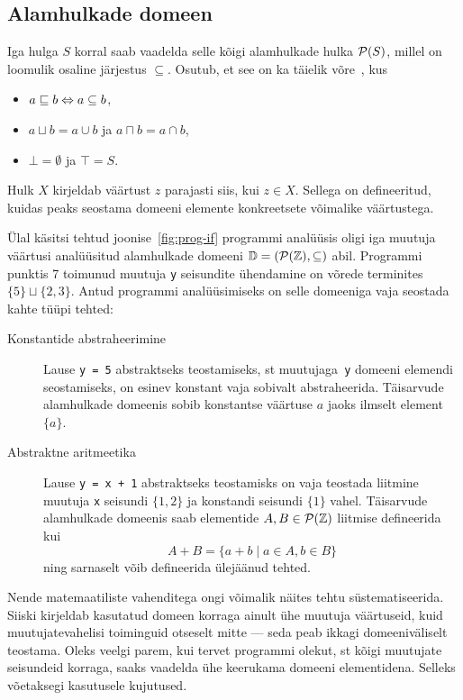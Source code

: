 \documentclass[../thesis.tex]{subfiles}
\begin{document}
\subsection{Alamhulkade domeen}
Iga hulga $S$ korral saab vaadelda selle kõigi alamhulkade hulka $\mathcal{P}(S)$, millel on loomulik osaline järjestus $\subseteq$.
Osutub, et see on ka täielik võre~\cite[6]{laan_voreteooria}, kus
\begin{itemize}[nosep]
	\item $a \sqsubseteq b \Leftrightarrow a \subseteq b$,
	\item $a \sqcup b = a \cup b$ ja $a \sqcap b = a \cap b$,
	\item $\bot = \emptyset$ ja $\top = S$.
\end{itemize}

Hulk $X$ kirjeldab väärtust $z$ parajasti siis, kui $z \in X$. Sellega on defineeritud, kuidas peaks seostama domeeni elemente konkreetsete võimalike väärtustega.

Ülal käsitsi tehtud joonise~\ref{fig:prog-if} programmi analüüsis oligi iga muutuja väärtusi analüüsitud alamhulkade domeeni $\mathbb{D} = (\mathcal{P}(\mathbb{Z}), \subseteq)$ abil. Programmi punktis 7 toimunud muutuja \texttt{y} seisundite ühendamine on võrede terminites $\{5\} \sqcup \{2, 3\}$. Antud programmi analüüsimiseks on selle domeeniga vaja seostada kahte tüüpi tehted:
\begin{description}
	\item[Konstantide abstraheerimine] Lause \texttt{y = 5} abstraktseks teostamiseks, st muutujaga~\texttt{y} domeeni elemendi seostamiseks, on esinev konstant vaja sobivalt abstraheerida. Täisarvude alamhulkade domeenis sobib konstantse väärtuse $a$ jaoks ilmselt element $\{a\}$.

	\item[Abstraktne aritmeetika] Lause \texttt{y = x + 1} abstraktseks teostamisks on vaja teostada liitmine muutuja \texttt{x} seisundi $\{1, 2\}$ ja konstandi seisundi $\{1\}$ vahel. Täisarvude alamhulkade domeenis saab elementide $A, B \in \mathcal{P}(\mathbb{Z})$ liitmise defineerida kui
	\[
		A + B = \{a + b \mid a \in A, b \in B\}
	\]
	ning sarnaselt võib defineerida ülejäänud tehted.
\end{description}

Nende matemaatiliste vahenditega ongi võimalik näites tehtu süstematiseerida. Siiski kirjeldab kasutatud domeen korraga ainult ühe muutuja väärtuseid, kuid muutujatevahelisi toiminguid otseselt mitte --- seda peab ikkagi domeeniväliselt teostama. Oleks veelgi parem, kui tervet programmi olekut, st kõigi muutujate seisundeid korraga, saaks vaadelda ühe keerukama domeeni elementidena. Selleks võetaksegi kasutusele kujutused.
\end{document}

